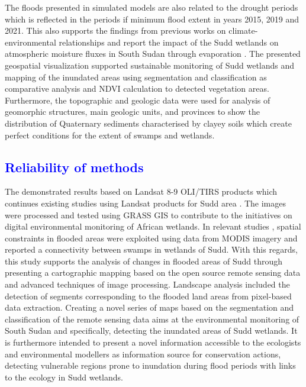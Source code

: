 \documentclass[analytics,article,submit,pdftex,moreauthors]{Definitions/mdpi}
\begin{document}
The floods presented in simulated models are also related to the drought periods which is reflected in the periods if minimum flood extent in years 2015, 2019 and 2021. This also supports the findings from previous works on climate-environmental relationships and report the impact of the Sudd wetlands on atmospheric moisture fluxes in South Sudan through evaporation \cite{Mohamed}. The presented geospatial visualization supported sustainable monitoring of Sudd wetlands and mapping of the inundated areas using segmentation and classification as comparative analysis and NDVI calculation to detected vegetation areas. Furthermore, the topographic and geologic data were used for analysis of geomorphic structures, main geologic units, and provinces to show the distribution of Quaternary sediments characterised by clayey soils which create perfect conditions for the extent of swamps and wetlands. 

\subsection{\textcolor{blue}{Reliability of methods}}
The demonstrated results based on Landsat 8-9 OLI/TIRS products which continues existing studies using Landsat products for Sudd area \cite{Petersenetal2008}. The images were processed and tested using GRASS GIS to contribute to the initiatives on digital environmental monitoring of African wetlands. In relevant studies \cite{DIVITTORIO2021100922}, spatial constraints in flooded areas were exploited using data from MODIS imagery and reported a connectivity between swamps in wetlands of Sudd. With this regards, this study supports the analysis of changes in flooded areas of Sudd through presenting a cartographic mapping based on the open source remote sensing data and advanced techniques of image processing. Landscape analysis included the detection of segments corresponding to the flooded land areas from pixel-based data extraction. Creating a novel series of maps based on the segmentation and classification of the remote sensing data aims at the environmental monitoring of South Sudan and specifically, detecting the inundated areas of Sudd wetlands. It is furthermore intended to present a novel information accessible to the ecologists and environmental modellers as information source for conservation actions, detecting vulnerable regions prone to inundation during flood periods with links to the ecology in Sudd wetlands. 
\end{document}
